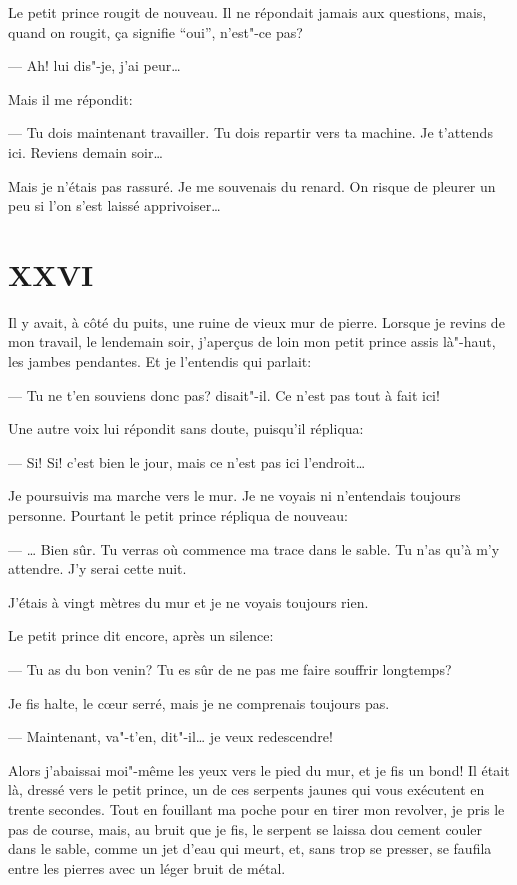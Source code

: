 Le petit prince rougit de nouveau. Il ne répondait jamais aux questions, mais, quand
on rougit, ça signifie ``oui'', n'est"-ce pas?

--- Ah! lui dis"-je, j'ai peur\ldots{}

Mais il me répondit:

--- Tu dois maintenant travailler. Tu dois repartir vers ta machine. Je t'attends ici.
Reviens demain soir\ldots{}

Mais je n'étais pas rassuré. Je me souvenais du renard. On risque de pleurer un peu
si l'on s'est laissé apprivoiser\ldots{}

\section{XXVI}
Il y avait, à côté du puits, une ruine de vieux mur de pierre. Lorsque je
revins de mon travail, le lendemain soir, j'aperçus de loin mon petit prince
assis là"-haut, les jambes pendantes. Et je l'entendis qui parlait:

--- Tu ne t'en souviens donc pas? disait"-il. Ce n'est pas tout à fait ici!

Une autre voix lui répondit sans doute, puisqu'il répliqua:

--- Si! Si! c'est bien le jour, mais ce n'est pas ici l'endroit\ldots{}

Je poursuivis ma marche vers le mur. Je ne voyais ni n'entendais toujours
personne. Pourtant le petit prince répliqua de nouveau:

--- \ldots{} Bien sûr. Tu verras où commence ma trace dans le sable. Tu n'as
qu’à m'y attendre. J'y serai cette nuit.

J'étais à vingt mètres du mur et je ne voyais toujours rien.

Le petit prince dit encore, après un silence:

--- Tu as du bon venin? Tu es sûr de ne pas me faire souffrir longtemps?

Je fis halte, le cœur serré, mais je ne comprenais toujours pas.

--- Maintenant, va"-t'en, dit"-il\ldots{} je veux redescendre!

Alors j'abaissai moi"-même les yeux vers le pied du mur, et je fis un bond!
Il était là, dressé vers le petit prince, un de ces serpents jaunes qui vous
exécutent en trente secondes. Tout en fouillant ma poche pour en tirer mon
revolver, je pris le pas de course, mais, au bruit que je fis, le serpent se
laissa dou cement couler dans le sable, comme un jet d'eau qui meurt, et,
sans trop se presser, se faufila entre les pierres avec un léger bruit de
métal.

